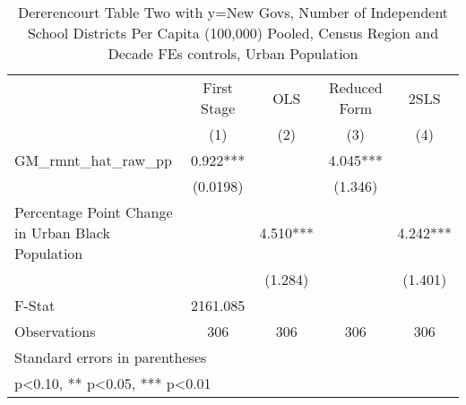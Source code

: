 \begin{table}[htbp]\centering
\def\sym#1{\ifmmode^{#1}\else\(^{#1}\)\fi}
\caption{Dererencourt Table Two with y=New Govs, Number of Independent School Districts Per Capita (100,000) Pooled, Census Region and Decade FEs controls, Urban Population}
\begin{tabular}{l*{4}{c}}
\toprule
                    & First Stage   &         OLS   &Reduced Form   &        2SLS   \\
                    &\multicolumn{1}{c}{(1)}   &\multicolumn{1}{c}{(2)}   &\multicolumn{1}{c}{(3)}   &\multicolumn{1}{c}{(4)}   \\
\midrule
GM\_rmnt\_hat\_raw\_pp  &       0.922***&               &       4.045***&               \\
                    &    (0.0198)   &               &     (1.346)   &               \\
\addlinespace
Percentage Point Change in Urban Black Population&               &       4.510***&               &       4.242***\\
                    &               &     (1.284)   &               &     (1.401)   \\
\midrule
F-Stat              &    2161.085   &               &               &               \\
Observations        &         306   &         306   &         306   &         306   \\
\bottomrule
\multicolumn{5}{l}{\footnotesize Standard errors in parentheses}\\
\multicolumn{5}{l}{\footnotesize * p<0.10, ** p<0.05, *** p<0.01}\\
\end{tabular}
\end{table}
